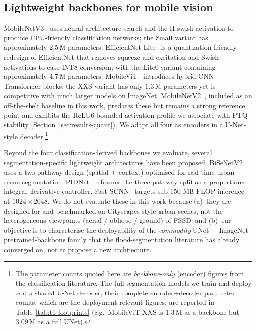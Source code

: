 \subsection{Lightweight backbones for mobile vision}
\label{sec:rw-backbones}

MobileNetV3~\cite{howard2019searching} uses neural architecture search and the H-swish activation to produce CPU-friendly classification networks; the Small variant has approximately 2.5\,M parameters. EfficientNet-Lite~\cite{tan2019efficientnet} is a quantization-friendly redesign of EfficientNet that removes squeeze-and-excitation and Swish activations to ease INT8 conversion, with the Lite0 variant containing approximately 4.7\,M parameters. MobileViT~\cite{mehta2022mobilevit} introduces hybrid CNN--Transformer blocks; the XXS variant has only 1.3\,M parameters yet is competitive with much larger models on ImageNet. MobileNetV2~\cite{sandler2018mobilenetv2}, included as an off-the-shelf baseline in this work, predates these but remains a strong reference point and exhibits the ReLU6-bounded activation profile we associate with PTQ stability (Section~\ref{sec:results-quant}). We adapt all four as encoders in a U-Net-style decoder.\footnote{The parameter counts quoted here are \emph{backbone-only} (encoder) figures from the classification literature. The full segmentation models we train and deploy add a shared U-Net decoder; their complete encoder$+$decoder parameter counts, which are the deployment-relevant figures, are reported in Table~\ref{tab:t1-footprints} (e.g.\ MobileViT-XXS is 1.3\,M as a backbone but 3.09\,M as a full UNet).}

Beyond the four classification-derived backbones we evaluate, several segmentation-specific lightweight architectures have been proposed. BiSeNetV2~\cite{yu2021bisenetv2} uses a two-pathway design (spatial $+$ context) optimised for real-time urban-scene segmentation. PIDNet~\cite{xu2023pidnet} reframes the three-pathway split as a proportional--integral--derivative controller. Fast-SCNN~\cite{poudel2019fastscnn} targets sub-150-MB-FLOP inference at $1024{\times}2048$. We do not evaluate these in this work because (a)~they are designed for and benchmarked on Cityscapes-style urban scenes, not the heterogeneous viewpoints (aerial / oblique / ground) of FSSD, and (b)~our objective is to characterise the deployability of the \emph{commodity} UNet $+$ ImageNet-pretrained-backbone family that the flood-segmentation literature has already converged on, not to propose a new architecture.

